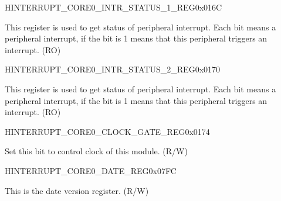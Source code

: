 \begin{register}{H}{INTERRUPT\_CORE0\_INTR\_STATUS\_1\_REG}{0x016C}\label{regdesc:INTERRUPTCORE0INTRSTATUS1REG}
%
\regnewline%
\begin{regdesc}\begin{reglist}
\label{fielddesc:INTERRUPTCORE0INTRSTATUS1}\item [INTERRUPT\_CORE0\_INTR\_STATUS\_1] This register is used to get status of peripheral interrupt. Each bit means a peripheral interrupt, if the bit is 1 means that this peripheral triggers an interrupt. (RO)
\end{reglist}\end{regdesc}
\end{register}


\begin{register}{H}{INTERRUPT\_CORE0\_INTR\_STATUS\_2\_REG}{0x0170}\label{regdesc:INTERRUPTCORE0INTRSTATUS2REG}
%
\regnewline%
\begin{regdesc}\begin{reglist}
\label{fielddesc:INTERRUPTCORE0INTRSTATUS2}\item [INTERRUPT\_CORE0\_INTR\_STATUS\_2] This register is used to get status of peripheral interrupt. Each bit means a peripheral interrupt, if the bit is 1 means that this peripheral triggers an interrupt. (RO)
\end{reglist}\end{regdesc}
\end{register}

\begin{register}{H}{INTERRUPT\_CORE0\_CLOCK\_GATE\_REG}{0x0174}\label{regdesc:INTERRUPTCORE0CLOCKGATEREG}
%
%
\regnewline%
\begin{regdesc}\begin{reglist}
\label{fielddesc:INTERRUPTCORE0REGCLKEN}\item [INTERRUPT\_CORE0\_CLK\_EN] Set this bit to control clock of this module. (R/W)
\end{reglist}\end{regdesc}
\end{register}

\begin{register}{H}{INTERRUPT\_CORE0\_DATE\_REG}{0x07FC}\label{regdesc:INTERRUPTCORE0DATEREG}
%
%
\regnewline%
\begin{regdesc}\begin{reglist}
\label{fielddesc:INTERRUPTCORE0INTERRUPTREGDATE}\item [INTERRUPT\_CORE0\_INTERRUPT\_DATE] This is the date version register. (R/W)
\end{reglist}\end{regdesc}
\end{register}


